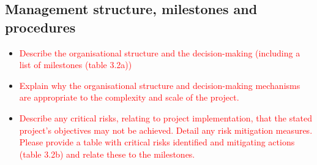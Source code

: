 \documentclass[11pt, a4paper]{article} %
\begin{document}

  
\subsection{Management structure, milestones and procedures}

\begin{itemize}
  \item \textcolor{red}{Describe the organisational structure and the
      decision-making (including a list of milestones (table 3.2a))}
\item \textcolor{red}{Explain why the organisational structure and
  decision-making mechanisms are appropriate to the complexity and
  scale of the project.}
\item \textcolor{red}{Describe any critical risks, relating to project
    implementation, that the stated project's objectives may not be
    achieved. Detail any risk mitigation measures. Please provide a
    table with critical risks identified and mitigating actions (table
    3.2b) and relate these to the milestones.}
\end{itemize}
\end{document}
